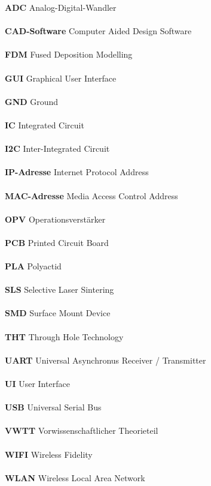 \documentclass[titlepage,12pt,twoside]{article}
\begin{document}
{\large \textbf{ADC}} Analog-Digital-Wandler \\
\\
{\large \textbf{CAD-Software}} Computer Aided Design Software \\
\\
{\large \textbf{FDM}} Fused Deposition Modelling \\
\\
{\large \textbf{GUI}} Graphical User Interface \\
\\
{\large \textbf{GND}} Ground \\
\\
{\large \textbf{IC}} Integrated Circuit \\
\\
{\large \textbf{I2C}} Inter-Integrated Circuit \\
\\
{\large \textbf{IP-Adresse}} Internet Protocol Address \\
\\
{\large \textbf{MAC-Adresse}} Media Access Control Address \\
\\
{\large \textbf{OPV}} Operationsverstärker \\
\\
{\large \textbf{PCB}} Printed Circuit Board \\
\\
{\large \textbf{PLA}} Polyactid \\
\\
{\large \textbf{SLS}} Selective Laser Sintering \\
\\
{\large \textbf{SMD}} Surface Mount Device \\
\\
{\large \textbf{THT}} Through Hole Technology \\
\\
{\large \textbf{UART}} Universal Asynchronus Receiver / Transmitter \\
\\
{\large \textbf{UI}} User Interface \\
\\
{\large \textbf{USB}} Universal Serial Bus \\
\\
{\large \textbf{VWTT}} Vorwissenschaftlicher Theorieteil \\
\\
{\large \textbf{WIFI}} Wireless Fidelity \\
\\
{\large \textbf{WLAN}} Wireless Local Area Network \\
\\
\end{document}
